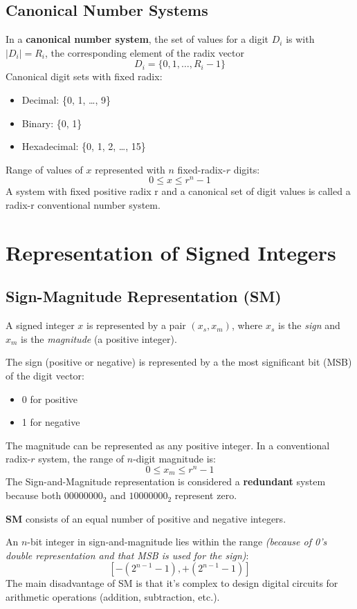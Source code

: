 \documentclass[10pt,a4paper]{book}
\begin{document}
\subsection{Canonical Number Systems}
In a \textbf{canonical number system}, the set of values for a digit \( D_i \) is with \( |D_i| = R_i \), the corresponding element of the radix vector
\[D_i = \{0, 1, \ldots, R_i - 1\}\]
Canonical digit sets with fixed radix:
\begin{itemize}
	\item Decimal: \{0, 1, \ldots, 9\}
	\item Binary: \{0, 1\}
	\item Hexadecimal: \{0, 1, 2, \ldots, 15\}
\end{itemize}
Range of values of \( x \) represented with \( n \) fixed-radix-\( r \) digits:
\[0 \leq x \leq r^n - 1\]
A system with fixed positive radix r and a canonical set of digit values is called a radix-r conventional number system.    
	
\section{Representation of Signed Integers}
\subsection{Sign-Magnitude Representation (SM)}
A signed integer $x$ is represented by a pair $(x_s, x_m)$, where $x_s$ is the \textit{sign} and $x_m$ is the \textit{magnitude} (a positive integer).\par 
The sign (positive or negative) is represented by a the most significant bit (MSB) of the digit vector:
\begin{itemize}
    	\item[] 0 for positive
    	\item[] 1 for negative
\end{itemize}
The magnitude can be represented as any positive integer. In a conventional radix-\( r \) system, the range of \( n \)-digit magnitude is:
\[ 0 \leq x_m \leq r^n - 1 \]
The Sign-and-Magnitude representation is considered a \textbf{redundant} system because both $00000000_2$ and $10000000_2$ represent zero.\par
\textbf{SM} consists of an equal number of positive and negative integers.\par
An $n$-bit integer in sign-and-magnitude lies within the range \textit{(because of 0's double representation and that MSB is used for the sign)}: 
\[[-\left(2^{n-1} - 1\right), +\left(2^{n-1} - 1\right)]\] 
The main disadvantage of SM is that it's complex to design digital circuits for arithmetic operations (addition, subtraction, etc.).
\end{document}
